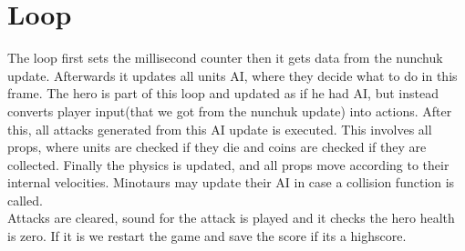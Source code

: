 \section{Loop} %
The loop first sets the millisecond counter then it gets data from the nunchuk update. Afterwards it updates all units AI, where they decide what to do in this frame. The hero is part of this loop and updated as if he had AI, but instead converts player input(that we got from the nunchuk update) into actions. After this, all attacks generated from this AI update is executed. This involves all props, where units are checked if they die and coins are checked if they are collected. Finally the physics is updated, and all props move according to their internal velocities. Minotaurs may update their AI in case a collision function is called.\\
Attacks are cleared, sound for the attack is played and it checks the hero health is zero. If it is we restart the game and save the score if its a highscore.

